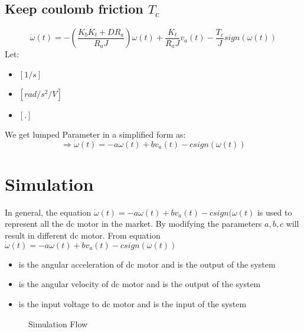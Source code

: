 \subsection{Keep coulomb friction \(T_c\)}
\begin{tcolorbox}[title=Lumped Parameters with Friction]
	\begin{equation}
		\dot{\omega}(t) = - (\frac{K_b K_t + D R_a}{R_a J})\omega(t) + \frac{K_t}{R_a J}v_a(t) - \frac{T_c}{J}sign(\omega(t))
		\label{dcmotoreq13}
	\end{equation}
	Let:
	\begin{itemize}
		\item { \([1/s]\) }
		\item { \([rad/s^2/V]\) }
		\item { \([.]\) }
	\end{itemize}
	We get lumped Parameter in a simplified form as:
	\begin{equation}
		\Rightarrow \dot{\omega}(t) = - a\omega(t) + bv_a(t) - csign(\omega(t))
		\label{dcmotoreq14}
	\end{equation}
\end{tcolorbox}


\section{Simulation}

In general, the equation \(\dot{\omega}(t) = - a\omega(t) + bv_a(t) - csign(\omega(t)\) is used to represent all the dc motor in the market. By modifying the parameters \(a, b, c\) will result in different dc motor.
From equation \(\dot{\omega}(t) = - a\omega(t) + bv_a(t) - csign(\omega(t))\)
\begin{itemize}
	\item { is the angular acceleration of dc motor and is the output of the system}
	\item { is the angular velocity of dc motor and is the output of the system}
	\item { is the input voltage to dc motor and is the input of the system}
\end{itemize}

\begin{figure}[ht]
	\centering
	
	\caption{Simulation Flow}
	\label{fig:Simulation Flow}
\end{figure}


